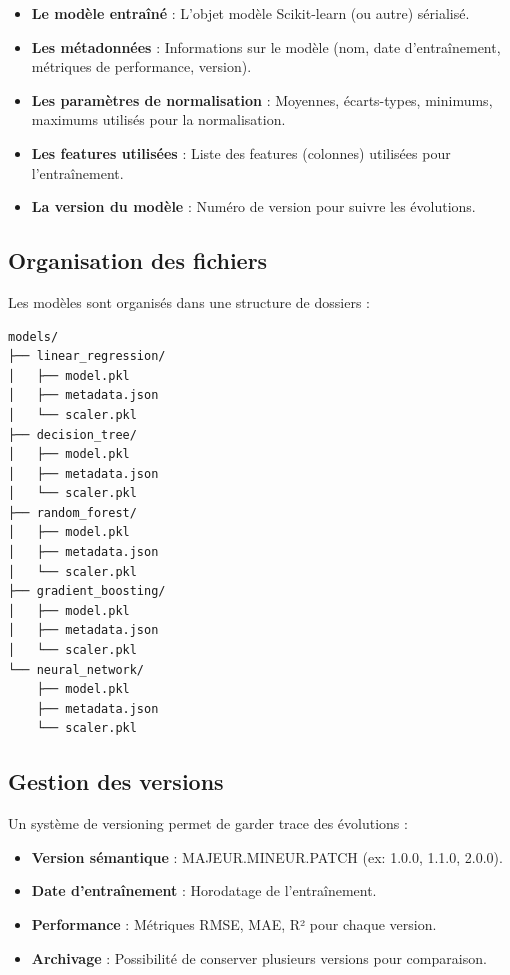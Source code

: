 \begin{itemize}
    \item \textbf{Le modèle entraîné} : L'objet modèle Scikit-learn (ou autre) sérialisé.
    \item \textbf{Les métadonnées} : Informations sur le modèle (nom, date d'entraînement, métriques de performance, version).
    \item \textbf{Les paramètres de normalisation} : Moyennes, écarts-types, minimums, maximums utilisés pour la normalisation.
    \item \textbf{Les features utilisées} : Liste des features (colonnes) utilisées pour l'entraînement.
    \item \textbf{La version du modèle} : Numéro de version pour suivre les évolutions.
\end{itemize}

\subsection{Organisation des fichiers}

Les modèles sont organisés dans une structure de dossiers :

\begin{verbatim}
models/
├── linear_regression/
│   ├── model.pkl
│   ├── metadata.json
│   └── scaler.pkl
├── decision_tree/
│   ├── model.pkl
│   ├── metadata.json
│   └── scaler.pkl
├── random_forest/
│   ├── model.pkl
│   ├── metadata.json
│   └── scaler.pkl
├── gradient_boosting/
│   ├── model.pkl
│   ├── metadata.json
│   └── scaler.pkl
└── neural_network/
    ├── model.pkl
    ├── metadata.json
    └── scaler.pkl
\end{verbatim}

\subsection{Gestion des versions}

Un système de versioning permet de garder trace des évolutions :

\begin{itemize}
    \item \textbf{Version sémantique} : MAJEUR.MINEUR.PATCH (ex: 1.0.0, 1.1.0, 2.0.0).
    \item \textbf{Date d'entraînement} : Horodatage de l'entraînement.
    \item \textbf{Performance} : Métriques RMSE, MAE, R² pour chaque version.
    \item \textbf{Archivage} : Possibilité de conserver plusieurs versions pour comparaison.
\end{itemize}

